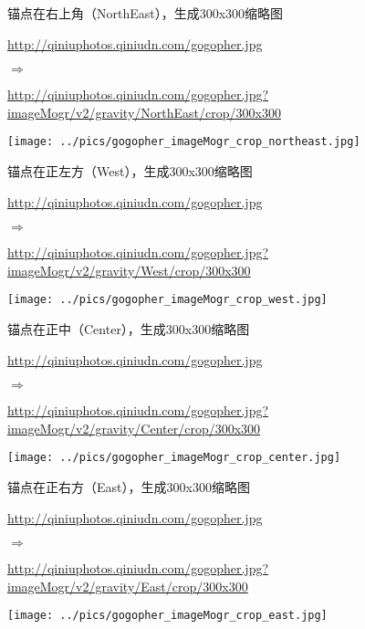 \documentclass[11pt, oneside]{book}
\newcommand{\qpar}[1]{
\vspace{0.25em}
\noindent
#1\par
\vspace{0.25em}
}
\newcommand{\qurl}[1]{\footnotesize\url{#1}\normalsize}
\begin{document}
\begin{CJK*}{UTF8}{song}
\begin{sample}
  \caption{锚点在右上角（NorthEast），生成300x300缩略图}
    \qpar{\qurl{http://qiniuphotos.qiniudn.com/gogopher.jpg}}
    \qpar{$\Rightarrow$}
    \qpar{\qurl{http://qiniuphotos.qiniudn.com/gogopher.jpg?imageMogr/v2/gravity/NorthEast/crop/300x300}}

    \begin{center}
      \texttt{[image: ../pics/gogopher\_imageMogr\_crop\_northeast.jpg]}
    \end{center}
  \label{imageMogr-crop-northeast}
\end{sample}

\begin{sample}
  \caption{锚点在正左方（West），生成300x300缩略图}
    \qpar{\qurl{http://qiniuphotos.qiniudn.com/gogopher.jpg}}
    \qpar{$\Rightarrow$}
    \qpar{\qurl{http://qiniuphotos.qiniudn.com/gogopher.jpg?imageMogr/v2/gravity/West/crop/300x300}}

    \begin{center}
      \texttt{[image: ../pics/gogopher\_imageMogr\_crop\_west.jpg]}
    \end{center}
  \label{imageMogr-crop-west}
\end{sample}

\begin{sample}
  \caption{锚点在正中（Center），生成300x300缩略图}
    \qpar{\qurl{http://qiniuphotos.qiniudn.com/gogopher.jpg}}
    \qpar{$\Rightarrow$}
    \qpar{\qurl{http://qiniuphotos.qiniudn.com/gogopher.jpg?imageMogr/v2/gravity/Center/crop/300x300}}

    \begin{center}
      \texttt{[image: ../pics/gogopher\_imageMogr\_crop\_center.jpg]}
    \end{center}
  \label{imageMogr-crop-center}
\end{sample}

\begin{sample}
  \caption{锚点在正右方（East），生成300x300缩略图}
    \qpar{\qurl{http://qiniuphotos.qiniudn.com/gogopher.jpg}}
    \qpar{$\Rightarrow$}
    \qpar{\qurl{http://qiniuphotos.qiniudn.com/gogopher.jpg?imageMogr/v2/gravity/East/crop/300x300}}

    \begin{center}
      \texttt{[image: ../pics/gogopher\_imageMogr\_crop\_east.jpg]}
    \end{center}
  \label{imageMogr-crop-east}
\end{sample}


\end{CJK*}
\end{document}
